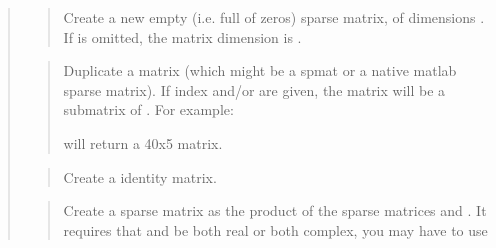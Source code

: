 \documentclass[a4paper,11pt,english]{sphinxmanual}
\begin{document}
\begin{quote}

\begin{quote}

Create a new empty (i.e. full of zeros) sparse matrix, of dimensions
. If  is omitted, the matrix dimension is .
\end{quote}

\begin{quote}

Duplicate a matrix  (which might be a spmat or a native matlab
sparse matrix). If index  and/or  are given, the matrix will
be a submatrix of . For example:

\begin{sphinxVerbatim}[commandchars=\\\{\}]
     \PYG{p}{[}    \PYG{p}{]}
\end{sphinxVerbatim}

will return a 40x5 matrix.
\end{quote}

\begin{quote}

Create a  identity matrix.
\end{quote}

\begin{quote}

Create a sparse matrix as the product of the sparse matrices  and
. It requires that  and  be both real or both complex, you
may have to use 
\end{quote}


\end{quote}
\end{document}
